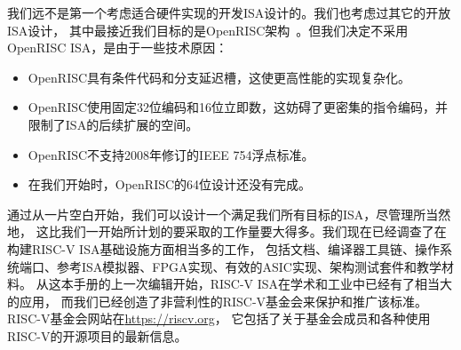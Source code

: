 我们远不是第一个考虑适合硬件实现的开发ISA设计的。我们也考虑过其它的开放ISA设计，
其中最接近我们目标的是OpenRISC架构~\cite{openriscarch}。但我们决定不采用OpenRISC ISA，是由于一些技术原因：

\begin{itemize}
\item OpenRISC具有条件代码和分支延迟槽，这使更高性能的实现复杂化。
\item OpenRISC使用固定32位编码和16位立即数，这妨碍了更密集的指令编码，并限制了ISA的后续扩展的空间。
\item OpenRISC不支持2008年修订的IEEE 754浮点标准。
\item 在我们开始时，OpenRISC的64位设计还没有完成。
\end{itemize}

通过从一片空白开始，我们可以设计一个满足我们所有目标的ISA，尽管理所当然地，
这比我们一开始所计划的要采取的工作量要大得多。我们现在已经调查了在构建RISC-V ISA基础设施方面相当多的工作，
包括文档、编译器工具链、操作系统端口、参考ISA模拟器、FPGA实现、有效的ASIC实现、架构测试套件和教学材料。
从这本手册的上一次编辑开始，RISC-V ISA在学术和工业中已经有了相当大的应用，
而我们已经创造了非营利性的RISC-V基金会来保护和推广该标准。RISC-V基金会网站在\url{https://riscv.org}，
它包括了关于基金会成员和各种使用RISC-V的开源项目的最新信息。


